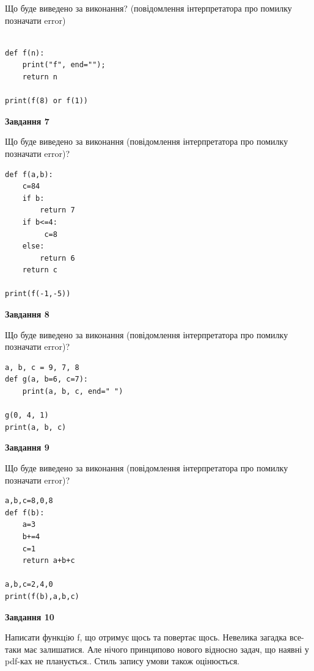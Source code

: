 \documentclass[12pt, ukrainian]{article}
\begin{document}
{\begin {large}
Що буде виведено за виконання? (повідомлення інтерпретатора про помилку позначати error)\par
\begin{verbatim}

def f(n):
    print("f", end="");
    return n

print(f(8) or f(1))
\end{verbatim}

{\begin {center}\textbf{Завдання 7}\end {center}}

Що буде виведено за виконання (повідомлення інтерпретатора про помилку позначати error)?\par
\begin{verbatim}
def f(a,b):
    c=84
    if b:
        return 7
    if b<=4:
         c=8
    else: 
        return 6
    return c

print(f(-1,-5))
\end{verbatim}

{\begin {center}\textbf{Завдання 8}\end {center}}

Що буде виведено за виконання (повідомлення інтерпретатора про помилку позначати error)?\par
\begin{verbatim}
a, b, c = 9, 7, 8
def g(a, b=6, c=7):
    print(a, b, c, end=" ")

g(0, 4, 1)
print(a, b, c)
\end{verbatim}

{\begin {center}\textbf{Завдання 9}\end {center}}

Що буде виведено за виконання (повідомлення інтерпретатора про помилку позначати error)?\par
\begin{verbatim}
a,b,c=8,0,8
def f(b):
    a=3
    b+=4
    c=1
    return a+b+c

a,b,c=2,4,0
print(f(b),a,b,c)
\end{verbatim}

{\begin {center}\textbf{Завдання 10}\end {center}}


Написати функцiю f, що отримує щось та повертає щось. Невелика загадка все-таки має залишатися. Але нічого принципово нового відносно задач, що наявні у pdf-ках не планується.. Стиль запису умови також оцінюється.\par
\end {large}}
\newpage
\end{document}
